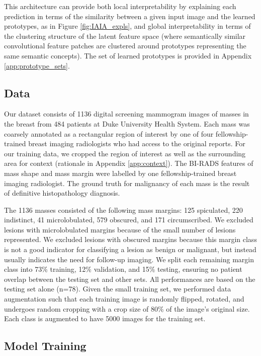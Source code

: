 \documentclass[11pt]{article}
\begin{document}
This architecture can provide both local interpretability by explaining each prediction in terms of the similarity between a given input image and the learned prototypes, as in Figure \ref{fig:IAIA_expls}, and global interpretability in terms of the clustering structure of the latent feature space (where semantically similar convolutional feature patches are clustered around prototypes representing the same semantic concepts). The set of learned prototypes is provided in Appendix \ref{app:prototype_sets}.

\subsection{Data}

Our dataset consists of 1136 digital screening mammogram images of masses in the breast from 484 patients at Duke University Health System. Each mass was coarsely annotated as a rectangular region of interest by one of four fellowship-trained breast imaging radiologists who had access to the original reports. For our training data, we cropped the region of interest as well as the surrounding area for context (rationale in Appendix \ref{app:context}). The BI-RADS features of mass shape and mass margin were labelled by one fellowship-trained breast imaging radiologist. The ground truth for malignancy of each mass is the result of definitive histopathology diagnosis.

The 1136 masses consisted of the following mass margins: 125 spiculated, 220 indistinct, 41 microlobulated, 579 obscured, and 171 circumscribed. We excluded lesions with microlobulated margins because of the small number of lesions represented. We excluded lesions with obscured margins because this margin class is not a good indicator for classifying a lesion as benign or malignant, but instead usually indicates the need for follow-up imaging. We split each remaining margin class into 73\% training, 12\% validation, and 15\% testing, ensuring no patient overlap between the testing set and other sets. All performances are based on the testing set alone (n=78). Given the small training set, we performed data augmentation such that each training image is randomly flipped, rotated, and undergoes random cropping with a crop size of 80\% of the image's original size. Each class is augmented to have 5000 images for the training set.

\subsection{Model Training} \label{sec:model_training}
\end{document}
